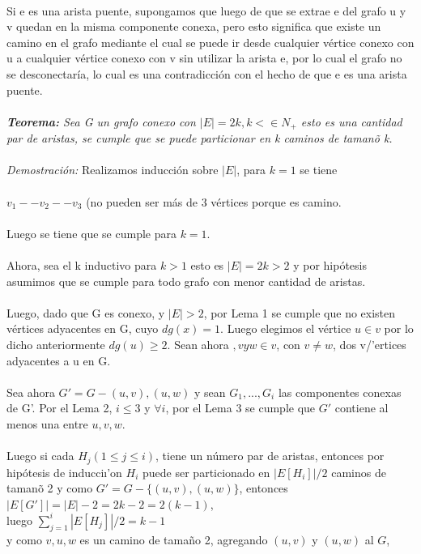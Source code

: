 \documentclass[12pt]{article}
\begin{document}
\\
Si e es una arista puente, supongamos que luego de que se extrae e del grafo u y v quedan en la misma componente conexa, pero esto significa que existe un camino en el grafo mediante el cual se puede ir desde cualquier v\'ertice conexo con u a cualquier v\'ertice conexo con v sin utilizar la arista e, por lo cual el grafo no se desconectar\'ia, lo cual es una contradicci\'on con el hecho de que e es una arista puente.\\
\\
\textit{ \textbf{Teorema:} Sea G un grafo conexo con $|E| = 2k, k< \in N_+$ esto es una cantidad par de aristas, se cumple que se puede particionar en k caminos de taman\~o k.}\\
\\
\textit{Demostración:} Realizamos inducci\'on sobre $|E|$, para $k = 1$ se tiene\\
\\
 			$v_1 -- v_2--v_3$  (no pueden ser m\'as de 3 v\'ertices porque es camino.\\
\\
Luego se tiene que se cumple para $k = 1$.\\
\\
Ahora, sea el k inductivo para $k > 1$ esto es $|E| = 2k > 2$ y por hip\'otesis asumimos que se cumple para todo grafo con menor cantidad de aristas.\\
\\
Luego, dado que G es conexo, y $|E| > 2$, por Lema 1 se cumple que no existen v\'ertices adyacentes en G, cuyo $dg(x) = 1$. Luego elegimos el v\'ertice $u \in v$ por lo dicho anteriormente $dg (u) \geq 2$. Sean ahora $,v y w \in v$, con $v \neq w$, dos v/'ertices adyacentes a u en G.\\
\\
Sea ahora $G'= G - {(u, v), (u, w)}$ y sean $G_1,..., G_i$ las componentes conexas de G'.  Por el Lema 2, $i \leq 3$ y $\forall i$, por el Lema 3 se cumple que $G'$ contiene al menos una entre ${u, v, w}$.\\
\\
Luego si cada $H_j(1 \leq j \leq i)$, tiene un n\'umero par de aristas, entonces por hip\'otesis de inducci\i'on
 $H_i$ puede ser particionado en $|E[H_i]|/2$ caminos de taman\~o 2 y como $G' = G - \{(u,v ), (u, w)\}$, entonces 
 $|E[G']| = |E| - 2 = 2k-2 = 2(k-1)$,\\
  luego $ \sum\limits_{j=1}^{i}|E[H_j]|/2 = k - 1$\\
   y como $ {v,u,w} $ es un camino de tama\~no 2, agregando $(u,v)$ y $(u,w)$ al $G$,\\
\end{document}
